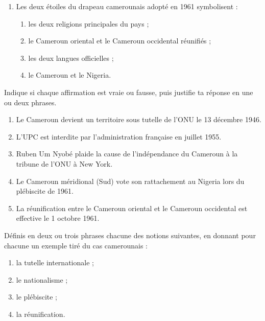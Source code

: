 \documentclass[11pt]{article}
\newcommand{\cle}[1]{{\popxbold\color{popdark}#1}}
\begin{document}
\begin{exercice}
\begin{enumerate}
\begin{enumerate}
\end{enumerate}
\item Les deux étoiles du drapeau camerounais adopté en 1961 symbolisent :
\begin{enumerate}
\item les deux religions principales du pays ;
\item le Cameroun oriental et le Cameroun occidental réunifiés ;
\item les deux langues officielles ;
\item le Cameroun et le Nigeria.
\end{enumerate}
\end{enumerate}
\end{exercice}

\begin{exercice}
Indique si chaque affirmation est vraie ou fausse, puis justifie ta réponse en une ou deux phrases.
\begin{enumerate}
\item Le Cameroun devient un territoire sous tutelle de l'ONU le 13 décembre 1946.
\item L'UPC est interdite par l'administration française en juillet 1955.
\item Ruben Um Nyobé plaide la cause de l'indépendance du Cameroun à la tribune de l'ONU à New York.
\item Le Cameroun méridional (Sud) vote son rattachement au Nigeria lors du plébiscite de 1961.
\item La réunification entre le Cameroun oriental et le Cameroun occidental est effective le 1\ier{} octobre 1961.
\end{enumerate}
\end{exercice}

\begin{exercice}[Définitions]
Définis en deux ou trois phrases chacune des notions suivantes, en donnant pour chacune un exemple tiré du cas camerounais :
\begin{enumerate}
\item la \cle{tutelle} internationale ;
\item le \cle{nationalisme} ;
\item le \cle{plébiscite} ;
\item la \cle{réunification}.
\end{enumerate}
\end{exercice}
\end{document}
